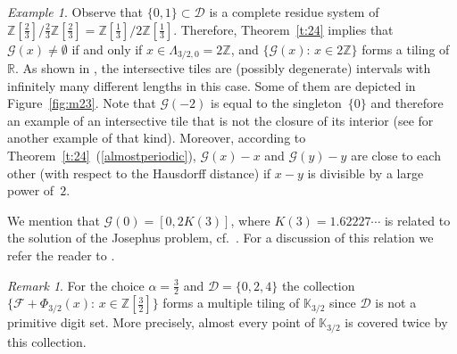 \documentclass[12pt]{amsart}
\theoremstyle{definition}
\theoremstyle{remark}
\newtheorem{remark}[lemma]{Remark}
\newtheorem{example}[lemma]{Example}
\numberwithin{equation}{section}
\begin{document}
\begin{example}
Observe that $\{0,1\} \subset \mathcal{D}$ is a complete residue system of $\mathbb{Z}[\frac{2}{3}]/\frac{2}{3}\mathbb{Z}[\frac{2}{3}] = \mathbb{Z}[\frac{1}{3}]/2\mathbb{Z}[\frac{1}{3}]$.
Therefore, Theorem~\ref{t:24} implies that $\mathcal{G}(x) \ne \emptyset$ if and only if $x \in \Lambda_{3/2,0} = 2 \mathbb{Z}$, and $\{\mathcal{G}(x):\, x \in 2 \mathbb{Z}\}$ forms a tiling of~$\mathbb{R}$.
As shown in \cite[Corollary~5.20]{BSSST:11}, the intersective tiles are (possibly degenerate) intervals with infinitely many different lengths in this case.   
Some of them are depicted in Figure~\ref{fig:m23}.
Note that $\mathcal{G}(-2)$ is equal to the singleton~$\{0\}$ and therefore an example of an intersective tile that is not the closure of its interior (see \cite[Example~3.12]{BSSST:11} for another example of that kind).
Moreover, according to Theorem~\ref{t:24}~(\ref{almostperiodic}), $\mathcal{G}(x)-x$ and $\mathcal{G}(y)-y$ are close to each other (with respect to the Hausdorff distance) if $x-y$ is divisible by a large power of~$2$.

We mention that $\mathcal{G}(0) = [0, 2 K(3)]$, where $K(3) = 1.62227 \cdots$ is related to the solution of the Josephus problem, cf.\ \cite[Corollary~1]{Odlyzko-Wilf:91}. For a discussion of this relation we refer the reader to \cite[Section~4.4 and Theorem~2]{Akiyama-Frougny-Sakarovitch:07}.
\end{example}

\begin{remark}
For the choice $\alpha=\frac32$ and $\mathcal{D}=\{0,2,4\}$ the collection  $\{\mathcal{F} + \Phi_{3/2}(x):\, x \in \mathbb{Z}[\frac{3}{2}]\}$ forms a multiple tiling of $\mathbb{K}_{3/2}$ since $\mathcal{D}$ is not a primitive digit set.
More precisely, almost every point of $\mathbb{K}_{3/2}$ is covered twice by this collection.
\end{remark}
\end{document}
